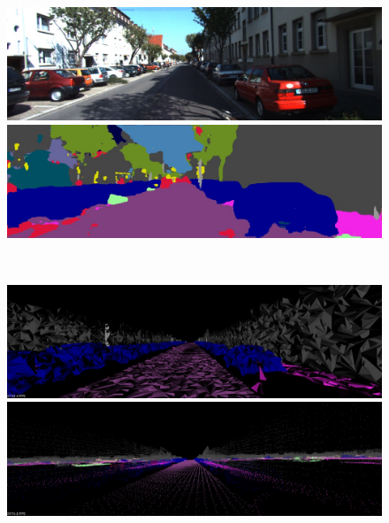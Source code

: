 \begin{figure}[htbp]
 \begin{minipage}[b]{0.50\hsize}
 \begin{center}
  \includegraphics[keepaspectratio, scale=0.18]{./picture/bgrimage/bgrimage3.jpg}
  \end{center}
 \end{minipage}
 \begin{minipage}[b]{0.5\hsize}
 \begin{center}
  \includegraphics[keepaspectratio, scale=0.18]{./picture/segimage/image3.jpg}
  \end{center}
 \end{minipage} \\
 \begin{minipage}[b]{0.50\hsize}
 \begin{center}
  \includegraphics[keepaspectratio, scale=0.18]{./picture/mesh_map_image/image3.jpg}
  \end{center}
 \end{minipage}
 \begin{minipage}[b]{0.50\hsize}
 \begin{center}
  \includegraphics[keepaspectratio, scale=0.18]{./picture/point_map_image/image3.jpg}

\end{center}
\end{minipage}
\end{figure}
